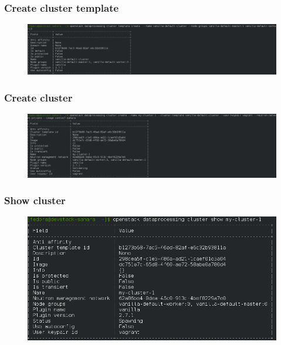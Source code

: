 \begin{frame}
	\frametitle{Create cluster template}
	\begin{figure}
		\includegraphics[width=1\linewidth]{images/6-create_cluster_template.png}
	\end{figure}
\end{frame}

\begin{frame}
	\frametitle{Create cluster}
	\begin{figure}
		\includegraphics[width=1\linewidth]{images/7-create_cluster.png}
	\end{figure}
\end{frame}

\begin{frame}
	\frametitle{Show cluster}
	\begin{figure}
		\includegraphics[width=1\linewidth]{images/8-show_cluster.png}
	\end{figure}
\end{frame}

